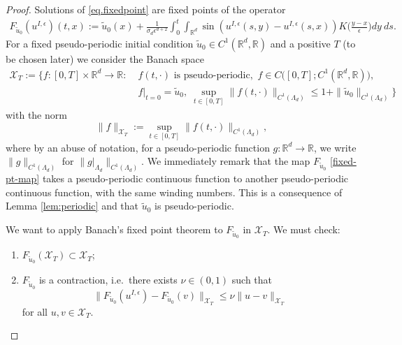 \documentclass[a4paper,11pt]{amsart}
\newcommand{\red}[1]{{#1}}
\newcommand{\R}{\mathbb{R}}
\newcommand{\ep}{\epsilon}
\numberwithin{equation}{section}
\numberwithin{theorem}{section}
\theoremstyle{definition}
\begin{document}
\begin{proof}

Solutions of \eqref{eq.fixedpoint} are fixed points of the operator
\begin{align}\label{fixed-pt-map}
F_{\tilde u_0}(u^{I,\ep})(t,x) :=\tilde  u_0(x) + \frac{1}{\sigma_d\ep^{d+2}}\int_0^t\int_{\red{\R^d}}\sin\left(u^{I,\ep}(s,y) - u^{I,\ep}(s,x)\right)K\Big(\frac{y-x}{\ep}\Big)dy\:ds.
\end{align}
For a fixed \red{pseudo-periodic} initial condition \red{$\tilde u_0\in C^1(\R^d,\R)$} and a positive $T$ (to be chosen later) we consider the Banach space 
\red{\begin{align}\label{banach-ball}
\mathcal{X}_T:=\Big\{f: [0,T]\times\R^d\to\R:\; & f(t,\cdot)\text{ is pseudo-periodic},\, \, f\in C\big([0,T];C^1(\R^d,\R)\big), \nonumber\\
&f|_{t=0}=\tilde u_0, \;  \sup_{t\in[0,T]}\|f(t,\cdot)\|_{C^1(\Lambda_d)}\le 1+\|\tilde u_0\|_{C^1(\Lambda_d)}\Big\}
\end{align}
with the norm 
\[
\|f\|_{\mathcal{X}_T} := \sup_{t\in[0,T]}\|f(t,\cdot)\|_{C^1(\Lambda_d)},
\]
where by an abuse of notation, for a pseudo-periodic function $g:\R^d\to\R$, we write $\|g\|_{C^1(\Lambda_d)}$ for $\|g|_{\Lambda_d}\|_{C^1(\Lambda_d)}$. We immediately remark that the map $F_{\tilde u_0}$ \eqref{fixed-pt-map} takes a pseudo-periodic continuous function to another pseudo-periodic continuous function, with the same winding numbers. This is a consequence of Lemma \ref{lem:periodic} and that $\tilde u_0$ is pseudo-periodic.
}

We want to apply Banach's fixed point theorem  to $F_{\tilde u_0}$ in $\mathcal{X}_T$. We must check:

\begin{enumerate}[label=(\alph*)]

\item $F_{\tilde u_0}(\mathcal{X}_T)\subset\mathcal{X}_T$;

\item $F_{\tilde u_0}$ is a contraction, i.e.~there exists $\nu\in(0,1)$ such that 
\begin{equation*}
\|F_{\tilde u_0}(u^{I,\ep})-F_{\tilde u_0}(v)\|_{\mathcal{X}_T}\leq \nu\|u-v\|_{\mathcal{X}_T}
\end{equation*}
for all $u, v\in \mathcal{X}_T$.
\end{enumerate}


\end{proof}
\end{document}
